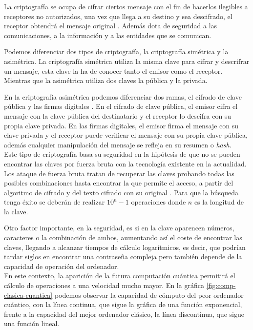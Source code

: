 La criptografía se ocupa de cifrar ciertos mensaje con el fin de hacerlos ilegibles a receptores no autorizados, una vez que llega a su destino y sea descifrado, el receptor obtendrá el mensaje original \cite{criptografia}. Además dota de seguridad a las comunicaciones, a la información y a las entidades que se comunican.

Podemos diferenciar dos tipos de criptografía, la criptografía simétrica y la asimétrica. La criptografía simétrica utiliza la misma clave para cifrar y descrifrar un mensaje, esta clave la ha de conocer tanto el emisor como el receptor. Mientras que la asimétrica utiliza dos claves la pública y la privada.

En la criptografía asimétrica podemos diferenciar dos ramas, el cifrado de clave pública y las firmas digitales \cite{criptografia-asimetrica}. En el cifrado de clave pública, el emisor cifra el mensaje con la clave pública del destinatario y el receptor lo descifra con su propia clave privada. En las firmas digitales, el emisor firma el mensaje con su clave privada y el receptor puede verificar el mensaje con su propia clave pública, además cualquier manipulación del mensaje se refleja en su resumen o \textit{hash}.\\

Este tipo de criptografía basa su seguridad en la hipótesis de que no se pueden encontrar las claves por fuerza bruta con la tecnología existente en la actualidad. Los ataque de fuerza bruta tratan de recuperar las claves probando todas las posibles combinaciones hasta encontrar la que permite el acceso, a partir del algoritmo de cifrado y del texto cifrado con su original \cite{fuerza-bruta}. Para que la búsqueda tenga éxito se deberán de realizar $10^n-1$ operaciones donde $n$ es la longitud de la clave. 

Otro factor importante, en la seguridad, es si en la clave aparencen números, caracteres o la combinación de ambos, aumentando así el coste de encontrar las claves, llegando a alcanzar tiempos de cálculo logarítmicos, es decir, que podrían tardar siglos en encontrar una contraseña compleja pero también depende de la capacidad de operación del ordenador.\\

En este contexto, la aparición de la futura computación cuántica permitirá el cálculo de operaciones a una velocidad mucho mayor. En la gráfica \ref{fig:comp-clasica-cuantica} podemos observar la capacidad de cómputo del peor ordenador cuántico, con la línea continua, que sigue la gráfica de una función exponencial, frente a la capacidad del mejor ordenador clásico, la línea discontinua, que sigue una función lineal.

